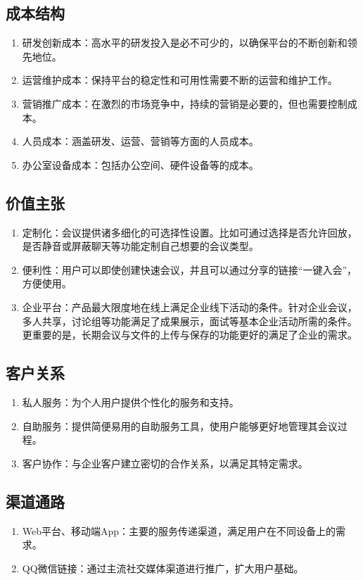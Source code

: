\documentclass[a4paper,12pt]{article}
\begin{document}
    \subsection{成本结构}
    \begin{enumerate}
        \item 研发创新成本：高水平的研发投入是必不可少的，以确保平台的不断创新和领先地位。
        \item 运营维护成本：保持平台的稳定性和可用性需要不断的运营和维护工作。
        \item 营销推广成本：在激烈的市场竞争中，持续的营销是必要的，但也需要控制成本。
        \item 人员成本：涵盖研发、运营、营销等方面的人员成本。
        \item 办公室设备成本：包括办公空间、硬件设备等的成本。
    \end{enumerate}

    \subsection{价值主张}
    \begin{enumerate}
        \item 定制化：会议提供诸多细化的可选择性设置。比如可通过选择是否允许回放，是否静音或屏蔽聊天等功能定制自己想要的会议类型。
        \item 便利性：用户可以即使创建快速会议，并且可以通过分享的链接“一键入会”，方便使用。
        \item 企业平台：产品最大限度地在线上满足企业线下活动的条件。针对企业会议，多人共享，讨论组等功能满足了成果展示，面试等基本企业活动所需的条件。更重要的是，长期会议与文件的上传与保存的功能更好的满足了企业的需求。
    \end{enumerate}

    \subsection{客户关系}
    \begin{enumerate}
        \item 私人服务：为个人用户提供个性化的服务和支持。
        \item 自助服务：提供简便易用的自助服务工具，使用户能够更好地管理其会议过程。
        \item 客户协作：与企业客户建立密切的合作关系，以满足其特定需求。
    \end{enumerate}

    \subsection{渠道通路}
    \begin{enumerate}
        \item Web平台、移动端App：主要的服务传递渠道，满足用户在不同设备上的需求。
        \item QQ微信链接：通过主流社交媒体渠道进行推广，扩大用户基础。
    \end{enumerate}
\end{document}
